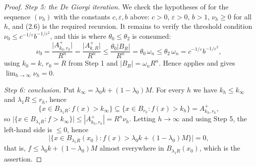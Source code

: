 \begin{proof}
\emph{Step 5: the De Giorgi iteration.}  We check the hypotheses of
 for the sequence $(\nu_h)$ with the constants
$c,\varepsilon,b$ above: $c>0$, $\varepsilon>0$, $b>1$, $\nu_h\ge0$ for all $h$,
and (2.6) is the required recursion.  It remains to verify the threshold
condition $\nu_0\le c^{-1/\varepsilon}b^{-1/\varepsilon^2}$, and this is where
$\theta_0\le\theta_2$ is consumed:
\[
\nu_0=\frac{\bigl|A^+_{k_0,r_0}\bigr|}{R^n}=\frac{\bigl|A^+_{k,R}\bigr|}{R^n}
\le\frac{\theta_0|B_R|}{R^n}=\theta_0\,\omega_n\le\theta_2\,\omega_n
=c^{-1/\varepsilon}b^{-1/\varepsilon^2} ,
\]
using $k_0=k$, $r_0=R$ from Step 1 and $|B_R|=\omega_nR^n$.  Hence
 applies and gives
$\lim_{h\to\infty}\nu_h=0$.

\emph{Step 6: conclusion.}  Put $k_\infty=\lambda_0k+(1-\lambda_0)M$.  For every
$h$ we have $k_h\le k_\infty$ and $\lambda_1R\le r_h$, hence
\[
\bigl\{x\in B_{\lambda_1R}:f(x)>k_\infty\bigr\}
\subseteq\bigl\{x\in B_{r_h}:f(x)>k_h\bigr\}=A^+_{k_h,r_h} ,
\]
so $\bigl|\{x\in B_{\lambda_1R}:f>k_\infty\}\bigr|\le|A^+_{k_h,r_h}|=R^n\nu_h$.
Letting $h\to\infty$ and using Step 5, the left-hand side is $\le0$, hence
\[
\bigl|\{x\in B_{\lambda_1R}(x_0):f(x)>\lambda_0k+(1-\lambda_0)M\}\bigr|=0 ,
\]
that is, $f\le\lambda_0k+(1-\lambda_0)M$ almost everywhere in
$B_{\lambda_1R}(x_0)$, which is the assertion.
\end{proof}
